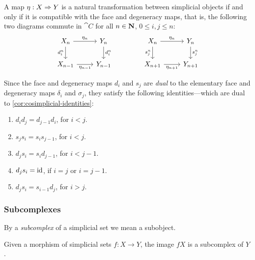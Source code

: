 A map \(\eta: X \Rightarrow Y\) is a natural transformation between simplicial objects
if and only if it is compatible with the face and degeneracy maps, that is, the
following two diagrams commute in \(\cat C\) for all \(n \in \mathbf{N}\),
\(0 \leq i, j\leq n\):
\[
    \begin{tikzcd}
        X_n \ar[r, "\eta_n"] \ar[d, "d_i^n"'] &Y_n \ar[d, "d_i^n"] \\
        X_{n-1} \ar[r, "\eta_{n-1}"'] &Y_{n-1}
    \end{tikzcd}
    \qquad
    \qquad
    \begin{tikzcd}
        X_n \ar[r, "\eta_n"] \ar[d, "s_j^n"'] &Y_n \ar[d, "s_j^n"] \\
        X_{n+1} \ar[r, "\eta_{n+1}"'] &Y_{n+1}
    \end{tikzcd}
\]

\begin{corollary}
    \label{cor:simplicial-identities}
    Since the face and degeneracy maps \(d_i\) and \(s_j\) are \emph{dual} to the
    elementary face and degeneracy maps \(\delta_i\) and \(\sigma_j\), they satisfy
    the following identities---which are dual to \cref{cor:cosimplicial-identities}:
    \begin{enumerate}[(1)]\setlength\itemsep{0em}
        \item \(d_i d_j = d_{j-1} d_i\), for \(i < j\).
        \item \(s_j s_i = s_i s_{j-1}\), for \(i < j\).
        \item \(d_j s_i = s_i d_{j-1}\), for \(i < j-1\).
        \item \(d_j s_i = \operatorname{id}\), if \(i = j\) or \(i = j-1\).
        \item \(d_j s_i = s_{i-1} d_j\), for \(i > j\).
    \end{enumerate}
\end{corollary}

\subsubsection{Subcomplexes}

\begin{definition}[Subcomplex]
    \label{def:subcomplex}
    By a \emph{subcomplex} of a simplicial set we mean a subobject.
\end{definition}

\begin{lemma}
    \label{lem:image-is-subcomplex}
    Given a morphism of simplicial sets \(f: X \to Y\), the image \(f X\) is a
    subcomplex of \(Y\).
\end{lemma}

